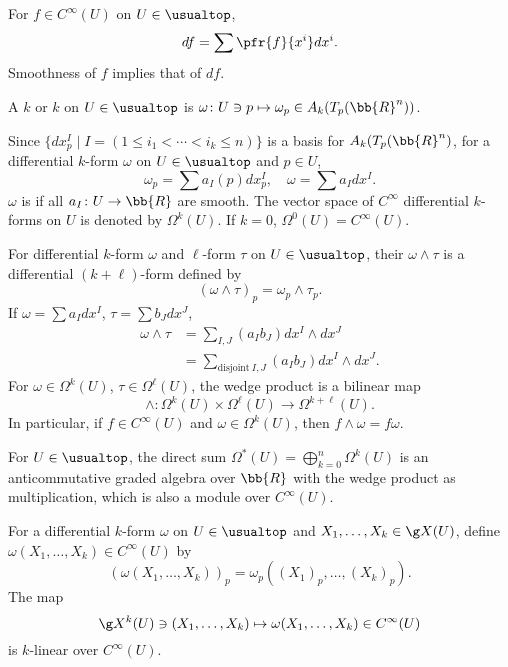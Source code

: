 For $f \in C^\infty(U)$ on $U \in \usualtop$,
\[
df = \sum \pfr{f}{x^i} dx^i.
\]
Smoothness of $f$ implies that of $df$.

A  $k$ or  $k$ on $U \in \usualtop$ is $\omega \colon U \ni p \mapsto \omega_p \in A_k (T_p(\bb{R}^n))$.

Since $\{ dx^I_p \mid I = (1 \le i_1 < \dotsb < i_k \le n) \}$ is a basis for $A_k (T_p(\bb{R}^n)$, for a differential $k$-form $\omega$ on $U \in \usualtop$ and $p \in U$,
\[
\omega_p = \sum a_I (p) dx^I_p,\quad \omega = \sum a_I dx^I.
\]
$\omega$ is  if all $a_I \colon U \to \bb{R}$ are smooth. The vector space of $C^\infty$  differential $k$-forms on $U$ is denoted by $\Omega^k(U)$. If $k = 0$, $\Omega^0(U) = C^\infty(U)$.

For differential $k$-form $\omega$ and $\ell$-form $\tau$ on $U \in \usualtop$, their  $\omega \wedge \tau$ is a differential $(k+\ell)$-form defined by
\[
(\omega \wedge \tau)_p = \omega_p \wedge \tau_p.
\]
If $\omega = \sum a_I dx^I$, $\tau = \sum b_J dx^J$,
\begin{align*}
\omega \wedge \tau &= \sum_{I,J} (a_I b_J) dx^I \wedge dx^J \\
&= \sum_{\text{disjoint}\ I, J} (a_I b_J) dx^I \wedge dx^J.
\end{align*}
For $\omega \in \Omega^k (U)$, $\tau \in \Omega^\ell (U)$, the wedge product is a bilinear map
\[
\wedge \colon \Omega^k(U) \times \Omega^\ell(U) \to \Omega^{k+\ell}(U).
\]
In particular, if $f \in C^\infty (U)$ and $\omega \in \Omega^k(U)$, then $f \wedge \omega = f \omega$.

For $U \in \usualtop$, the direct sum $\Omega^* (U) = \bigoplus_{k = 0}^n \Omega^k(U)$ is an anticommutative graded algebra over $\bb{R}$ with the wedge product as multiplication, which is also a module over $C^\infty (U)$.


For a differential $k$-form $\omega$ on $U \in \usualtop$ and $X_1, \dotsc, X_k \in \g X(U)$, define $\omega (X_1, \dotsc, X_k) \in C^\infty(U)$ by
\[
(\omega (X_1, \dotsc, X_k))_p = \omega_p ((X_1)_p, \dotsc, (X_k)_p).
\]
The map
\[
\g X^k(U)  \ni (X_1, \dotsc, X_k) \mapsto \omega(X_1, \dotsc, X_k) \in C^\infty(U)
\]
is $k$-linear over $C^\infty(U)$.

